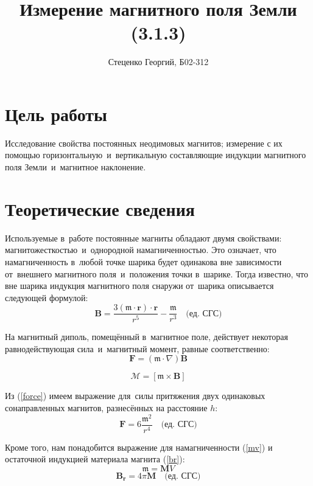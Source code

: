 \documentclass[12pt, a4paper]{article}
\title{Измерение магнитного поля Земли (3.1.3)}
\author{Стеценко Георгий, Б02-312}
\date{}
\newcommand{\m}{\mathfrak{m}}
\newcommand{\cgs}{\quad\text{(ед. СГС)}}
\begin{document}
	\maketitle
	
	\section{Цель работы} 
Исследование свойства постоянных неодимовых магнитов; измерение с
их помощью горизонтальную~и~вертикальную составляющие индукции магнитного поля
Земли~и~магнитное наклонение.

\section{Теоретические сведения}
Используемые в~работе постоянные магниты обладают двумя свойствами: магнитожесткостью~и~однородной намагниченностью. Это означает, что намагниченность в~любой точке шарика будет одинакова вне зависимости от~внешнего магнитного поля~и~положения точки в~шарике. Тогда известно, что вне шарика индукция магнитного поля снаружи от~шарика описывается следующей формулой:
\begin{equation}
\mathbf{B} = \frac{3(\m \cdot \mathbf{r})\cdot\mathbf{r}}{r^5} - \frac{\m}{r^3}\cgs
\label{dipole_eq}
\end{equation}

На магнитный диполь, помещённый в~магнитное поле, действует некоторая равнодействующая сила~и~магнитный момент, равные соответственно:
\begin{equation}
\mathbf{F} = (\m \cdot \nabla)\mathbf{B} 
\label{force}
\end{equation}

\begin{equation}
\mathcal{M} = \left[ \m \times \mathbf{B} \right]
\label{momentum}
\end{equation}

Из (\ref{force}) имеем выражение для~силы притяжения двух одинаковых сонаправленных магнитов, разнесённых на расстояние $h$:
\begin{equation}
\mathbf{F} = 6 \frac{\m^2}{r^4}\cgs
\label{force_eq}
\end{equation}

Кроме того, нам понадобится выражение для намагниченности (\ref{mv}) и остаточной индукцией материала магнита (\ref{br}):
\begin{equation}
	\m = \mathbf{M}V
	\label{mv}
\end{equation}
\begin{equation}
	\mathbf{B_r} = 4\pi \mathbf{M} \cgs
	\label{br}
\end{equation}
\end{document}
